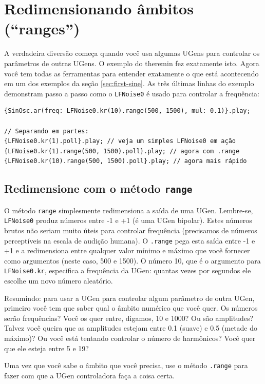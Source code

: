 \section{Redimensionando âmbitos (“ranges”)}

A verdadeira diversão começa quando você usa algumas UGens para controlar os parâmetros de outras UGens. O exemplo do theremin fez exatamente isto. Agora você tem todas as ferramentas para entender exatamente o que está acontecendo em um dos exemplos da seção \ref{sec:first-sine}. As três últimas linhas do exemplo demonstram passo a passo como o \texttt{LFNoise0} é usado para controlar a frequência:

\begin{lstlisting}[style=SuperCollider-IDE, basicstyle=\scttfamily\footnotesize]
{SinOsc.ar(freq: LFNoise0.kr(10).range(500, 1500), mul: 0.1)}.play;

// Separando em partes:
{LFNoise0.kr(1).poll}.play; // veja um simples LFNoise0 em ação
{LFNoise0.kr(1).range(500, 1500).poll}.play; // agora com .range
{LFNoise0.kr(10).range(500, 1500).poll}.play; // agora mais rápido
\end{lstlisting}

\subsection{Redimensione com o método \texttt{range}}
O método  \texttt{range} simplesmente redimensiona a saída de uma UGen. Lembre-se, \texttt{LFNoise0} produz números entre -1 e +1 (é uma UGen bipolar). Estes números brutos não seriam muito úteis para controlar frequência (precisamos de números perceptíveis na escala de audição humana). O \texttt{.range} pega esta saída entre -1 e +1 e a redimensiona entre qualquer valor mínimo e máximo que você fornecer como argumentos (neste caso, 500 e 1500). O número 10, que é o argumento para \texttt{LFNoise0.kr}, especifica a frequência da UGen: quantas vezes por segundos ele escolhe um novo número aleatório.

Resumindo: para usar a UGen para controlar algum parâmetro de outra UGen, primeiro você tem que saber qual o âmbito numérico que você quer. Os números serão frequências? Você os quer entre, digamos, 10 e 1000? Ou são amplitudes? Talvez você queira que as amplitudes estejam entre 0.1 (suave) e 0.5 (metade do máximo)? Ou você está tentando controlar o número de harmônicos? Você quer que ele esteja entre 5 e 19?

Uma vez que você sabe o âmbito que você precisa, use o método \texttt{.range} para fazer com que a UGen controladora faça a coisa certa.

